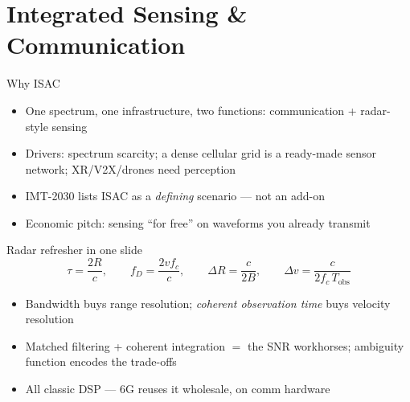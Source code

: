 \section{Integrated Sensing \& Communication}

\begin{frame}{Why ISAC}
  \begin{itemize}\itemsep2pt
    \item One spectrum, one infrastructure, \alert{two functions}:
          communication + radar-style sensing
    \item Drivers: spectrum scarcity; a dense cellular grid is a ready-made
          sensor network; XR/V2X/drones need perception
    \item IMT-2030 lists ISAC as a \emph{defining} scenario --- not an add-on
    \item Economic pitch: sensing ``for free'' on waveforms you already
          transmit
  \end{itemize}
\end{frame}

\begin{frame}{Radar refresher in one slide}
  \begin{equation*}
    \tau=\frac{2R}{c},\qquad
    f_D=\frac{2v f_c}{c},\qquad
    \Delta R=\frac{c}{2B},\qquad
    \Delta v=\frac{c}{2 f_c\,T_{\mathrm{obs}}}
  \end{equation*}
  \begin{itemize}\itemsep2pt
    \item Bandwidth buys range resolution; \emph{coherent observation time}
          buys velocity resolution
    \item Matched filtering + coherent integration $=$ the SNR workhorses;
          ambiguity function encodes the trade-offs
    \item All classic DSP --- 6G reuses it wholesale, on comm hardware
  \end{itemize}
\end{frame}

